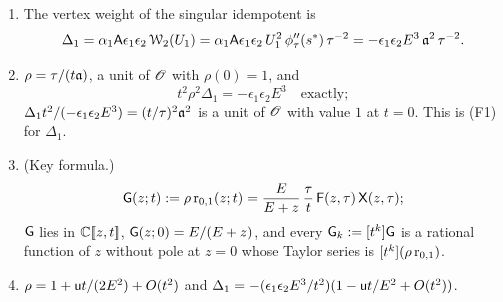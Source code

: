 \begin{prop}
\label{prop:lea-key}
\begin{enumerate}
\item The vertex weight of the singular idempotent is
\[
\Delta_1 = \alpha_1\mathsf{A}\epsilon_1\epsilon_2\,\mathcal{W}_2(U_1) = \alpha_1\mathsf{A}\epsilon_1\epsilon_2\,U_1^2\,\phi_\tau''(s^{\ast})\,\tau^{-2} = -\epsilon_1\epsilon_2E^3\,\mathfrak{a}^2\,\tau^{-2}.
\]
\item $\rho = \tau/(t\mathfrak{a})$, a unit of $\mathscr{O}$ with $\rho(0) = 1$, and
\begin{equation}
\label{eq:lea-rho}
t^2\rho^2\Delta_1 = -\epsilon_1\epsilon_2E^3\quad\text{exactly};
\end{equation}
$\Delta_1t^2/(-\epsilon_1\epsilon_2E^3) = (t/\tau)^2\mathfrak{a}^2$ is a unit of $\mathscr{O}$ with value $1$ at $t = 0$. This is (F1) for $\Delta_1$.
\item (Key formula.)
\begin{equation}
\label{eq:lea-key}
\mathsf{G}(z;t) := \rho\,\mathrm{r}_{0,1}(z;t) = \frac{E}{E+z}\,\frac{\tau}{t}\,\mathsf{F}(z,\tau)\,\mathsf{X}(z,\tau);
\end{equation}
$\mathsf{G}$ lies in $\mathbb{C}[\![ z,t ]\!]$, $\mathsf{G}(z;0) = E/(E+z)$, and every $\mathsf{G}_k := [t^k]\mathsf{G}$ is a rational function of $z$ without pole at $z = 0$ whose Taylor series is $[t^k](\rho\,\mathrm{r}_{0,1})$.
\item $\rho = 1 + \mathsf{u} t/(2E^2) + O(t^2)$ and $\Delta_1 = -(\epsilon_1\epsilon_2E^3/t^2)(1 - \mathsf{u} t/E^2 + O(t^2))$.
\end{enumerate}
\end{prop}

